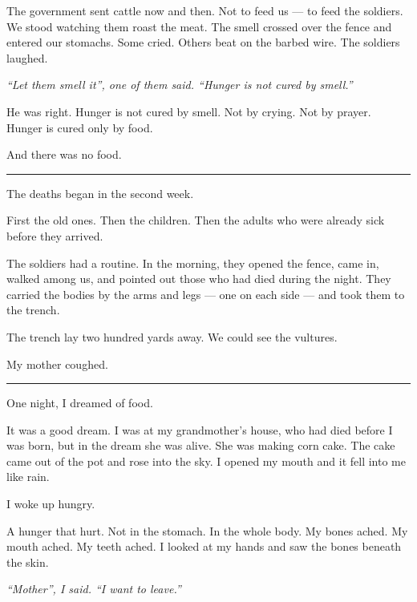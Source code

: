 \noindent The government sent cattle now and then. Not to feed us --- to feed the soldiers. We stood watching them roast the meat. The smell crossed over the fence and entered our stomachs. Some cried. Others beat on the barbed wire. The soldiers laughed.

\noindent \textit{\textquotedblleft{}Let them smell it\textquotedblright{}\textit{, one of them said. }\textquotedblleft{}Hunger is not cured by smell.\textquotedblright{}}

\noindent He was right. Hunger is not cured by smell. Not by crying. Not by prayer. Hunger is cured only by food.

\noindent And there was no food.

\vspace{0.5em}\noindent\rule{\textwidth}{0.5pt}\vspace{0.5em}

\noindent The deaths began in the second week.

\noindent First the old ones. Then the children. Then the adults who were already sick before they arrived.

\noindent The soldiers had a routine. In the morning, they opened the fence, came in, walked among us, and pointed out those who had died during the night. They carried the bodies by the arms and legs --- one on each side --- and took them to the trench.

\noindent The trench lay two hundred yards away. We could see the vultures.

\noindent My mother coughed.

\vspace{0.5em}\noindent\rule{\textwidth}{0.5pt}\vspace{0.5em}

\noindent One night, I dreamed of food.

\noindent It was a good dream. I was at my grandmother's house, who had died before I was born, but in the dream she was alive. She was making corn cake. The cake came out of the pot and rose into the sky. I opened my mouth and it fell into me like rain.

\noindent I woke up hungry.

\noindent A hunger that hurt. Not in the stomach. In the whole body. My bones ached. My mouth ached. My teeth ached. I looked at my hands and saw the bones beneath the skin.

\noindent \textit{\textquotedblleft{}Mother\textquotedblright{}\textit{, I said. }\textquotedblleft{}I want to leave.\textquotedblright{}}

